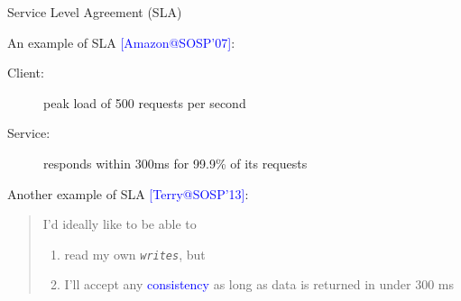 \documentclass{beamer}
\makeatletter
\newcommand{\citeinbeamer}[3]{{\scriptsize{\textcolor{blue}{[#1@#2'#3]}}}}
\newcommand{\blue}[1]{\textcolor{blue}{#1}}
\makeatother
\begin{document}
\begin{frame}{Service Level Agreement (SLA)}
  \begin{exampleblock}{An example of SLA \citeinbeamer{Amazon}{SOSP}{07}:}
    \begin{description}
      \item[Client:] peak load of 500 requests per second
      \item[Service:] responds within 300ms for 99.9\% of its requests
    \end{description}
  \end{exampleblock}

  \begin{exampleblock}{Another example of SLA \citeinbeamer{Terry}{SOSP}{13}:}
    \begin{quote}
      I'd ideally like to be able to
      \begin{enumerate}
        \item read my own \texttt{\it writes}, but
        \item I'll accept any \blue{consistency} as long as data is returned in
        under 300 ms
      \end{enumerate}
    \end{quote}
  \end{exampleblock}

\end{frame}
\end{document}
